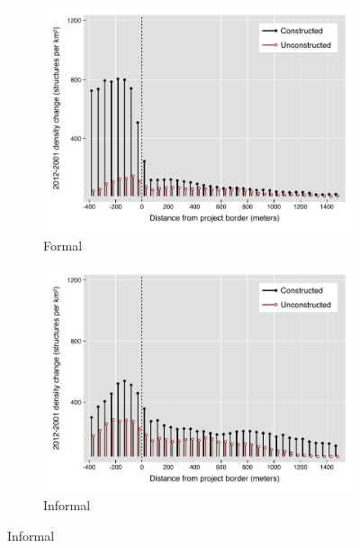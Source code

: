 \documentclass[12pt]{article}
\begin{document}
\begin{figure}
        \begin{subfigure}[b]{0.495\textwidth}
            \centering
        \caption{Formal}
            \includegraphics[width=\textwidth,trim={0.3cm .3cm 0.1cm 0cm}, clip=true]{figures/bblu_for_rawchanges_4}
        \end{subfigure}
        \hfill
        \begin{subfigure}[b]{0.495\textwidth}  
            \centering 
        \caption{Informal}
            \includegraphics[width=\textwidth,trim={0.3cm .3cm 0.1cm 0cm}, clip=true]{figures/bblu_inf_rawchanges_4.pdf}
        \end{subfigure}
\end{figure}
\end{document}

